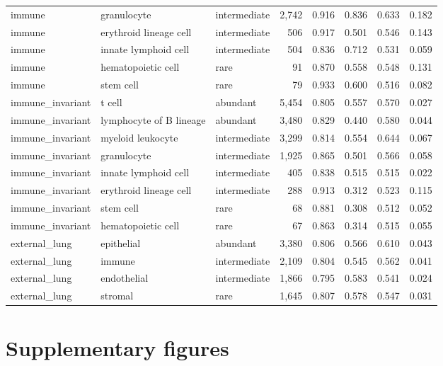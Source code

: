 \documentclass[a4paper,11pt]{article}
\begin{document}
\begin{longtable}{l l l r r r r r}
immune & granulocyte & intermediate & 2{,}742 & 0.916 & 0.836 & 0.633 & 0.182 \\
immune & erythroid lineage cell & intermediate & 506 & 0.917 & 0.501 & 0.546 & 0.143 \\
immune & innate lymphoid cell & intermediate & 504 & 0.836 & 0.712 & 0.531 & 0.059 \\
immune & hematopoietic cell & rare & 91 & 0.870 & 0.558 & 0.548 & 0.131 \\
immune & stem cell & rare & 79 & 0.933 & 0.600 & 0.516 & 0.082 \\
\addlinespace
immune\_invariant & t cell & abundant & 5{,}454 & 0.805 & 0.557 & 0.570 & 0.027 \\
immune\_invariant & lymphocyte of B lineage & abundant & 3{,}480 & 0.829 & 0.440 & 0.580 & 0.044 \\
immune\_invariant & myeloid leukocyte & intermediate & 3{,}299 & 0.814 & 0.554 & 0.644 & 0.067 \\
immune\_invariant & granulocyte & intermediate & 1{,}925 & 0.865 & 0.501 & 0.566 & 0.058 \\
immune\_invariant & innate lymphoid cell & intermediate & 405 & 0.838 & 0.515 & 0.515 & 0.022 \\
immune\_invariant & erythroid lineage cell & intermediate & 288 & 0.913 & 0.312 & 0.523 & 0.115 \\
immune\_invariant & stem cell & rare & 68 & 0.881 & 0.308 & 0.512 & 0.052 \\
immune\_invariant & hematopoietic cell & rare & 67 & 0.863 & 0.314 & 0.515 & 0.055 \\
\addlinespace
external\_lung & epithelial & abundant & 3{,}380 & 0.806 & 0.566 & 0.610 & 0.043 \\
external\_lung & immune & intermediate & 2{,}109 & 0.804 & 0.545 & 0.562 & 0.041 \\
external\_lung & endothelial & intermediate & 1{,}866 & 0.795 & 0.583 & 0.541 & 0.024 \\
external\_lung & stromal & rare & 1{,}645 & 0.807 & 0.578 & 0.547 & 0.031 \\
\end{longtable}

\clearpage
\section{Supplementary figures}
\label{sec:supp_figures}
\end{document}
